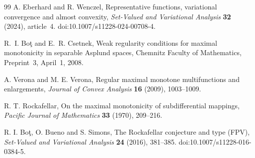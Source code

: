 \begin{thebibliography}{99}
A. Eberhard and R. Wenczel,
Representative functions, variational convergence and almost convexity,
\emph{Set-Valued and Variational Analysis} \textbf{32} (2024), article~4.
doi:10.1007/s11228-024-00708-4.

R.~I. Bo\c{t} and E.~R. Csetnek,
Weak regularity conditions for maximal monotonicity in separable
Asplund spaces,
Chemnitz Faculty of Mathematics, Preprint~3, April~1, 2008.

A. Verona and M. E. Verona,
Regular maximal monotone multifunctions and enlargements,
\emph{Journal of Convex Analysis} \textbf{16} (2009), 1003--1009.

R. T. Rockafellar,
On the maximal monotonicity of subdifferential mappings,
\emph{Pacific Journal of Mathematics} \textbf{33} (1970), 209--216.

R. I. Bo\c{t}, O. Bueno and S. Simons,
The Rockafellar conjecture and type (FPV),
\emph{Set-Valued and Variational Analysis} \textbf{24} (2016), 381--385.
doi:10.1007/s11228-016-0384-5.

\end{thebibliography}


